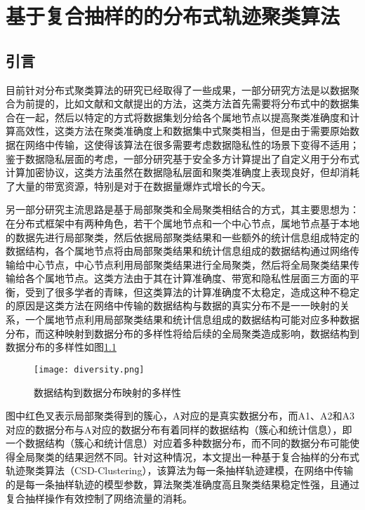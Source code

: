 \chapter{基于复合抽样的的分布式轨迹聚类算法}


\section{引言}
目前针对分布式聚类算法的研究已经取得了一些成果，一部分研究方法是以数据聚合为前提的，比如文献\cite{FanA}和文献\cite{Wang2018A}提出的方法，这类方法首先需要将分布式中的数据集合在一起，然后以特定的方式将数据集划分给各个属地节点以提高聚类准确度和计算高效性，这类方法在聚类准确度上和数据集中式聚类相当，但是由于需要原始数据在网络中传输，这使得该算法在很多需要考虑数据隐私性的场景下变得不适用；鉴于数据隐私层面的考虑，一部分研究基于安全多方计算提出了自定义用于分布式计算加密协议，这类方法虽然在数据隐私层面和聚类准确度上表现良好，但却消耗了大量的带宽资源，特别是对于在数据量爆炸式增长的今天。

另一部分研究主流思路是基于局部聚类和全局聚类相结合的方式，其主要思想为：在分布式框架中有两种角色，若干个属地节点和一个中心节点，属地节点基于本地的数据先进行局部聚类，然后依据局部聚类结果和一些额外的统计信息组成特定的数据结构，各个属地节点将由局部聚类结果和统计信息组成的数据结构通过网络传输给中心节点，中心节点利用局部聚类结果进行全局聚类，然后将全局聚类结果传输给各个属地节点。这类方法由于其在计算准确度、带宽和隐私性层面三方面的平衡，受到了很多学者的青睐，但这类算法的计算准确度不太稳定，造成这种不稳定的原因是这类方法在网络中传输的数据结构与数据的真实分布不是一一映射的关系，一个属地节点利用局部聚类结果和统计信息组成的数据结构可能对应多种数据分布，而这种映射到数据分布的多样性将给后续的全局聚类造成影响，数据结构到数据分布的多样性如图\ref{diversity}
\begin{figure}[h]
	\texttt{[image: diversity.png]}
	\caption{数据结构到数据分布映射的多样性}
	\label{diversity}
\end{figure}

图中红色叉表示局部聚类得到的簇心，A对应的是真实数据分布，而A1、A2和A3对应的数据分布与A对应的数据分布有着同样的数据结构（簇心和统计信息），即一个数据结构（簇心和统计信息）对应着多种数据分布，而不同的数据分布可能使得全局聚类的结果迥然不同。针对这种情况，本文提出一种基于复合抽样的分布式轨迹聚类算法（CSD-Clustering），该算法为每一条抽样轨迹建模，在网络中传输的是每一条抽样轨迹的模型参数，算法聚类准确度高且聚类结果稳定性强，且通过复合抽样操作有效控制了网络流量的消耗。

